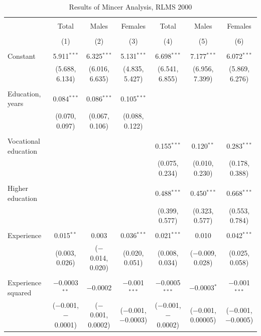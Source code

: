 \documentclass[alpha-refs]{wiley-article-01g}
\begin{document}
\begin{landscape}

\fontsize{9}{11}
\selectfont

\begin{table}[!htbp] \centering 
\renewcommand{\arraystretch}{1.0}
  \caption{Results of Mincer Analysis, RLMS 2000} 
  \label{} 
\begin{tabular}{@{\extracolsep{5pt}}lcccccc} 
\\[-1.8ex]\hline 
\hline \\[-1.8ex] 
 & Total & Males & Females & Total & Males & Females \\ 
\\[-1.8ex] & (1) & (2) & (3) & (4) & (5) & (6)\\ 
\hline \\[-1.8ex] 
 Constant & 5.911$^{***}$ & 6.325$^{***}$ & 5.131$^{***}$ & 6.698$^{***}$ & 7.177$^{***}$ & 6.072$^{***}$ \\ 
  & (5.688, 6.134) & (6.016, 6.635) & (4.835, 5.427) & (6.541, 6.855) & (6.956, 7.399) & (5.869, 6.276) \\ 
  & & & & & & \\ 
 Education, years & 0.084$^{***}$ & 0.086$^{***}$ & 0.105$^{***}$ &  &  &  \\ 
  & (0.070, 0.097) & (0.067, 0.106) & (0.088, 0.122) &  &  &  \\ 
  & & & & & & \\ 
 Vocational education &  &  &  & 0.155$^{***}$ & 0.120$^{**}$ & 0.283$^{***}$ \\ 
  &  &  &  & (0.075, 0.234) & (0.010, 0.230) & (0.178, 0.388) \\ 
  & & & & & & \\ 
 Higher education &  &  &  & 0.488$^{***}$ & 0.450$^{***}$ & 0.668$^{***}$ \\ 
  &  &  &  & (0.399, 0.577) & (0.323, 0.577) & (0.553, 0.784) \\ 
  & & & & & & \\ 
 Experience & 0.015$^{**}$ & 0.003 & 0.036$^{***}$ & 0.021$^{***}$ & 0.010 & 0.042$^{***}$ \\ 
  & (0.003, 0.026) & ($-$0.014, 0.020) & (0.020, 0.051) & (0.008, 0.034) & ($-$0.009, 0.028) & (0.025, 0.058) \\ 
  & & & & & & \\ 
 Experience squared & $-$0.0003$^{**}$ & $-$0.0002 & $-$0.001$^{***}$ & $-$0.0005$^{***}$ & $-$0.0003$^{*}$ & $-$0.001$^{***}$ \\ 
  & ($-$0.001, $-$0.0001) & ($-$0.001, 0.0002) & ($-$0.001, $-$0.0003) & ($-$0.001, $-$0.0002) & ($-$0.001, 0.00005) & ($-$0.001, $-$0.0005) \\ 

\end{tabular}
\end{table}
\end{landscape}
\end{document}
